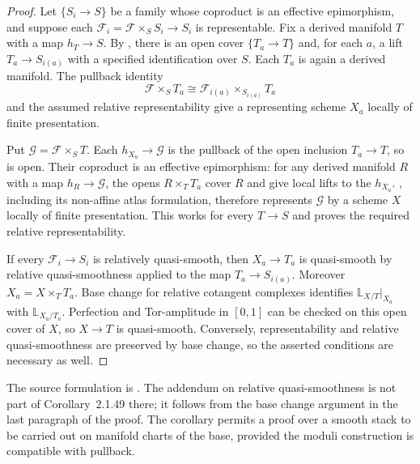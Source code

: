 \begin{proof}
Let $\{S_i\to S\}$ be a family whose coproduct is an effective
epimorphism, and suppose each
$\mathcal F_i=\mathcal F\times_S S_i\to S_i$ is representable.
Fix a derived manifold $T$ with a map $h_T\to S$. By
, there is an open
cover $\{T_a\to T\}$ and, for each $a$, a lift
$T_a\to S_{i(a)}$ with a specified identification over $S$.
Each $T_a$ is again a derived manifold.
The pullback identity
\[
 \mathcal F\times_S T_a
 \cong\mathcal F_{i(a)}\times_{S_{i(a)}}T_a
\]
and the assumed relative representability give a representing
scheme $X_a$ locally of finite presentation.

Put $\mathcal G=\mathcal F\times_S T$.
Each $h_{X_a}\to\mathcal G$ is the pullback of the open inclusion
$T_a\to T$, so is open. Their coproduct is an effective epimorphism:
for any derived manifold $R$ with a map $h_R\to\mathcal G$, the opens $R\times_T T_a$
cover $R$ and give local lifts to the $h_{X_a}$.
, including its non-affine
atlas formulation, therefore represents $\mathcal G$ by a scheme
$X$ locally of finite presentation. This works for every $T\to S$
and proves the required relative representability.

If every $\mathcal F_i\to S_i$ is relatively quasi-smooth, then
$X_a\to T_a$ is quasi-smooth by relative quasi-smoothness applied to
the map $T_a\to S_{i(a)}$.
Moreover $X_a=X\times_T T_a$. Base change for relative cotangent
complexes identifies $\mathbb L_{X/T}|_{X_a}$ with
$\mathbb L_{X_a/T_a}$. Perfection and Tor-amplitude in $[0,1]$
can be checked on this open cover of $X$, so $X\to T$ is
quasi-smooth. Conversely, representability and relative
quasi-smoothness are preserved by base change, so the asserted
conditions are necessary as well.
\end{proof}

The source formulation is
\cite[Definition~2.1.42 and Corollary~2.1.49]
{Steffens_Representability_Elliptic_Moduli}.
The addendum on relative quasi-smoothness is not part of Corollary~2.1.49
there; it follows from the base change argument in the last paragraph of
the proof. The corollary permits a proof over a smooth stack to be
carried out on manifold charts of the base, provided the moduli
construction is compatible with pullback.

